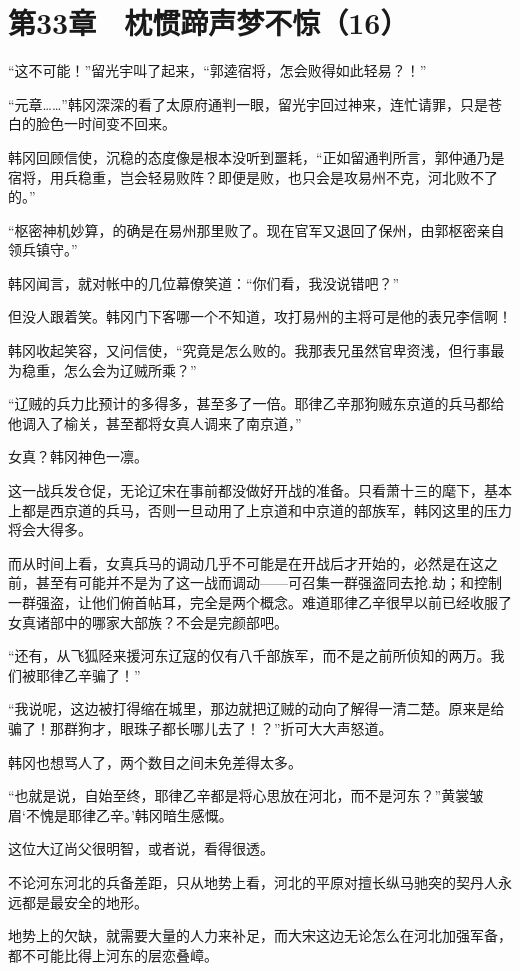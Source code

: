 \section{第33章　枕惯蹄声梦不惊（16）}

“这不可能！”留光宇叫了起来，“郭逵宿将，怎会败得如此轻易？！”

“元章……”韩冈深深的看了太原府通判一眼，留光宇回过神来，连忙请罪，只是苍白的脸色一时间变不回来。

韩冈回顾信使，沉稳的态度像是根本没听到噩耗，“正如留通判所言，郭仲通乃是宿将，用兵稳重，岂会轻易败阵？即便是败，也只会是攻易州不克，河北败不了的。”

“枢密神机妙算，的确是在易州那里败了。现在官军又退回了保州，由郭枢密亲自领兵镇守。”

韩冈闻言，就对帐中的几位幕僚笑道：“你们看，我没说错吧？”

但没人跟着笑。韩冈门下客哪一个不知道，攻打易州的主将可是他的表兄李信啊！

韩冈收起笑容，又问信使，“究竟是怎么败的。我那表兄虽然官卑资浅，但行事最为稳重，怎么会为辽贼所乘？”

“辽贼的兵力比预计的多得多，甚至多了一倍。耶律乙辛那狗贼东京道的兵马都给他调入了榆关，甚至都将女真人调来了南京道，”

女真？韩冈神色一凛。

这一战兵发仓促，无论辽宋在事前都没做好开战的准备。只看萧十三的麾下，基本上都是西京道的兵马，否则一旦动用了上京道和中京道的部族军，韩冈这里的压力将会大得多。

而从时间上看，女真兵马的调动几乎不可能是在开战后才开始的，必然是在这之前，甚至有可能并不是为了这一战而调动——可召集一群强盗同去抢.劫；和控制一群强盗，让他们俯首帖耳，完全是两个概念。难道耶律乙辛很早以前已经收服了女真诸部中的哪家大部族？不会是完颜部吧。

“还有，从飞狐陉来援河东辽寇的仅有八千部族军，而不是之前所侦知的两万。我们被耶律乙辛骗了！”

“我说呢，这边被打得缩在城里，那边就把辽贼的动向了解得一清二楚。原来是给骗了！那群狗才，眼珠子都长哪儿去了！？”折可大大声怒道。

韩冈也想骂人了，两个数目之间未免差得太多。

“也就是说，自始至终，耶律乙辛都是将心思放在河北，而不是河东？”黄裳皱眉‘不愧是耶律乙辛。’韩冈暗生感慨。

这位大辽尚父很明智，或者说，看得很透。

不论河东河北的兵备差距，只从地势上看，河北的平原对擅长纵马驰突的契丹人永远都是最安全的地形。

地势上的欠缺，就需要大量的人力来补足，而大宋这边无论怎么在河北加强军备，都不可能比得上河东的层恋叠嶂。

